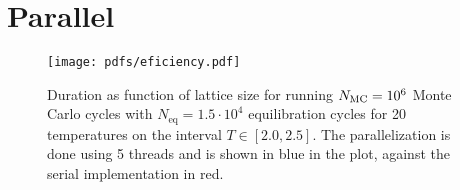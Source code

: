 \section{Parallel}

\begin{figure}[!ht]
    \texttt{[image: pdfs/eficiency.pdf]} 
    \caption{Duration as function of lattice size for running $N_\mathrm{MC}=10^6$ Monte Carlo cycles with $N_\mathrm{eq}=1.5\cdot 10^4$ equilibration cycles for 20 temperatures on the interval $T\in[2.0,2.5]$. The parallelization is done using 5 threads and is shown in blue in the plot, against the serial implementation in red.} 
    \label{fig:efficiency}
\end{figure} 